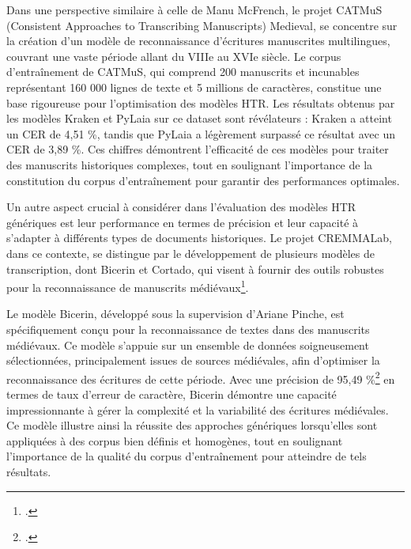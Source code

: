 \documentclass[a4paper,12pt,twoside]{book}
\begin{document}
	Dans une perspective similaire à celle de Manu McFrench, le projet CATMuS (Consistent Approaches to Transcribing Manuscripts) Medieval, se concentre sur la création d’un modèle de reconnaissance d’écritures manuscrites multilingues, couvrant une vaste période allant du VIIIe au XVIe siècle. Le corpus d’entraînement de CATMuS, qui comprend 200 manuscrits et incunables représentant 160 000 lignes de texte et 5 millions de caractères, constitue une base rigoureuse pour l’optimisation des modèles HTR. Les résultats obtenus par les modèles Kraken et PyLaia sur ce dataset sont révélateurs : Kraken a atteint un CER de 4,51 \%, tandis que PyLaia a légèrement surpassé ce résultat avec un CER de 3,89 \%. Ces chiffres démontrent l’efficacité de ces modèles pour traiter des manuscrits historiques complexes, tout en soulignant l’importance de la constitution du corpus d’entraînement pour garantir des performances optimales. 
	
	Un autre aspect crucial à considérer dans l’évaluation des modèles HTR génériques est leur performance en termes de précision et leur capacité à s’adapter à différents types de documents historiques. Le projet CREMMALab, dans ce contexte, se distingue par le développement de plusieurs modèles de transcription, dont Bicerin et Cortado, qui visent à fournir des outils robustes pour la reconnaissance de manuscrits médiévaux\footcite{pinche_generic_2023}.
	
	Le modèle Bicerin, développé sous la supervision d’Ariane Pinche, est spécifiquement conçu pour la reconnaissance de textes dans des manuscrits médiévaux. Ce modèle s’appuie sur un ensemble de données soigneusement sélectionnées, principalement issues de sources médiévales, afin d’optimiser la reconnaissance des écritures de cette période. Avec une précision de 95,49 \%\footcite{pinche_images_2022} en termes de taux d’erreur de caractère, Bicerin démontre une capacité impressionnante à gérer la complexité et la variabilité des écritures médiévales. Ce modèle illustre ainsi la réussite des approches génériques lorsqu’elles sont appliquées à des corpus bien définis et homogènes, tout en soulignant l’importance de la qualité du corpus d’entraînement pour atteindre de tels résultats.
	
\end{document}
